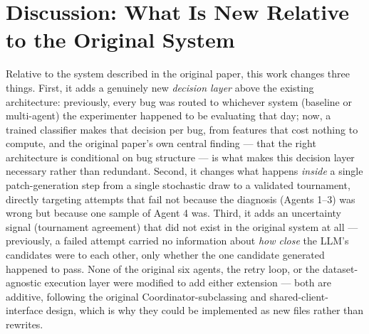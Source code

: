 \documentclass[conference]{IEEEtran}
\begin{document}
\section{Discussion: What Is New Relative to the Original System}
\label{sec:discussion}
Relative to the system described in the original paper, this work changes three things. First, it adds a genuinely new \emph{decision layer} above the existing architecture: previously, every bug was routed to whichever system (baseline or multi-agent) the experimenter happened to be evaluating that day; now, a trained classifier makes that decision per bug, from features that cost nothing to compute, and the original paper's own central finding — that the right architecture is conditional on bug structure — is what makes this decision layer necessary rather than redundant. Second, it changes what happens \emph{inside} a single patch-generation step from a single stochastic draw to a validated tournament, directly targeting attempts that fail not because the diagnosis (Agents 1--3) was wrong but because one sample of Agent 4 was. Third, it adds an uncertainty signal (tournament agreement) that did not exist in the original system at all — previously, a failed attempt carried no information about \emph{how close} the LLM's candidates were to each other, only whether the one candidate generated happened to pass. None of the original six agents, the retry loop, or the dataset-agnostic execution layer were modified to add either extension — both are additive, following the original Coordinator-subclassing and shared-client-interface design, which is why they could be implemented as new files rather than rewrites.

\end{document}
